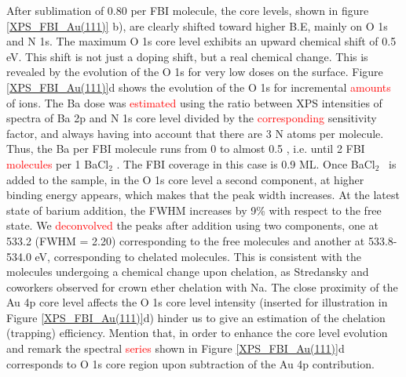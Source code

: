 \documentclass[aps,prl,reprint,longbibliography,superscriptaddress, english]{revtex4-1}
\def\BappCl{BaCl$_2$ }
\begin{document}
After sublimation of 0.80 \Bapp per FBI molecule, the core levels, shown in figure \ref{XPS_FBI_Au(111)} b), are clearly shifted toward higher B.E, mainly on O 1s and N 1s. The maximum O 1s core level exhibits an upward chemical shift of 0.5 eV. This shift is not just a doping shift, but a real chemical change. This is revealed by the evolution of the O 1s for very low \Bapp doses on the surface. Figure \ref{XPS_FBI_Au(111)}d shows the evolution of the O 1s for incremental \textcolor{red}{amounts} of \Bapp ions. The Ba dose was \textcolor{red}{estimated} using the ratio between XPS intensities of spectra of Ba 2p and N 1s core level divided by the \textcolor{red}{corresponding} sensitivity factor, and always having into account that there are 3 N atoms per molecule. Thus, the Ba per FBI molecule runs from 0 to almost 0.5 , i.e. until 2 FBI \textcolor{red}{molecules} per 1 \BappCl. The FBI coverage in this case is 0.9 ML. Once \BappCl\ is added to the sample, in the O 1s core level a second component, at higher binding energy appears, which makes that the peak width increases. At the latest state of barium addition, the FWHM increases by 9\% with respect to the free state. We \textcolor{red}{deconvolved} the peaks after \Bapp addition using two components, one at 533.2 (FWHM = 2.20) corresponding to the free molecules and another at 533.8-534.0 eV, corresponding to chelated molecules. This is consistent with the molecules undergoing a chemical change upon chelation, as Stredansky and coworkers observed for crown ether chelation with Na.\cite{stredansky_-surface_2019}  The close proximity of the Au 4p core level affects the O 1s core level intensity (inserted for illustration in Figure \ref{XPS_FBI_Au(111)}d) hinder us to give an estimation of the chelation (trapping) efficiency. Mention that, in order to enhance the core level evolution and remark the spectral \textcolor{red}{series} shown in Figure \ref{XPS_FBI_Au(111)}d corresponds to O 1s core region upon subtraction of the Au 4p contribution. 
\end{document}
